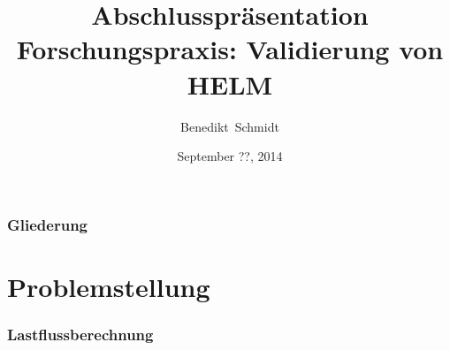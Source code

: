 \documentclass[hyperref={pdfpagelabels=false},compress]{beamer}
\title{Abschlusspräsentation Forschungspraxis: Validierung von HELM}
\author[Schmidt]{Benedikt~Schmidt}
\institute{Technische Universität München, Germany}
\date{September ??, 2014}
\begin{document}
\begin{frame}
	\titlepage
\end{frame}

\begin{frame}
	\frametitle{Gliederung}
	\tableofcontents
\end{frame}

\section{Problemstellung}
\begin{frame}
	\frametitle{Lastflussberechnung}
\end{frame}
\end{document}
